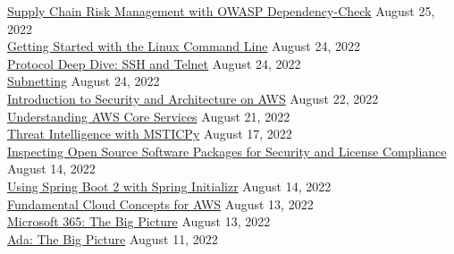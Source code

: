 \documentclass[10pt]{res} %
\begin{document}
\begin{resume}
\href{https://bjdelacruz.dev/files/certificates/pluralsight/2_Supply_Chain_Risk_Management_with_OWASP_Dependency_Check.pdf}{\color{blue}Supply Chain Risk Management with OWASP Dependency-Check} \hfill August 25, 2022 \\
\href{https://bjdelacruz.dev/files/certificates/pluralsight/3_Getting_Started_with_the_Linux_Command_Line.pdf}{\color{blue}Getting Started with the Linux Command Line} \hfill August 24, 2022 \\
\href{https://bjdelacruz.dev/files/certificates/pluralsight/Protocol_Deep_Dive_SSH_and_Telnet.pdf}{\color{blue}Protocol Deep Dive: SSH and Telnet} \hfill August 24, 2022 \\
\href{https://bjdelacruz.dev/files/certificates/pluralsight/Subnetting.pdf}{\color{blue}Subnetting} \hfill August 24, 2022 \\
\href{https://bjdelacruz.dev/files/certificates/pluralsight/3_Introduction_to_Security_and_Architecture_on_AWS.pdf}{\color{blue}Introduction to Security and Architecture on AWS} \hfill August 22, 2022 \\
\href{https://bjdelacruz.dev/files/certificates/pluralsight/2_Understanding_AWS_Core_Services.pdf}{\color{blue}Understanding AWS Core Services} \hfill August 21, 2022 \\
\href{https://bjdelacruz.dev/files/certificates/pluralsight/26_Threat_Intelligence_with_MSTICPy.pdf}{\color{blue}Threat Intelligence with MSTICPy} \hfill August 17, 2022 \\
\href{https://bjdelacruz.dev/files/certificates/pluralsight/7_Inspecting_Open_Source_Software_Packages_for_Security_and_License_Compliance.pdf}{\color{blue}Inspecting Open Source Software Packages for Security and License Compliance} \hfill August 14, 2022 \\
\href{https://bjdelacruz.dev/files/certificates/pluralsight/Using_Spring_Boot_2_with_Spring_Initializr.pdf}{\color{blue}Using Spring Boot 2 with Spring Initializr} \hfill August 14, 2022 \\
\href{https://bjdelacruz.dev/files/certificates/pluralsight/1_Fundamental_Cloud_Concepts_for_AWS.pdf}{\color{blue}Fundamental Cloud Concepts for AWS} \hfill August 13, 2022 \\
\href{https://bjdelacruz.dev/files/certificates/pluralsight/Microsoft_365_The_Big_Picture.pdf}{\color{blue}Microsoft 365: The Big Picture} \hfill August 13, 2022 \\
\href{https://bjdelacruz.dev/files/certificates/pluralsight/Ada_The_Big_Picture.pdf}{\color{blue}Ada: The Big Picture} \hfill August 11, 2022 \\

\end{resume}
\end{document}
